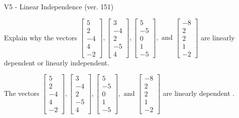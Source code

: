 \begin{exercise}
  \begin{exerciseTitle}V5 - Linear Independence (ver. 151)\end{exerciseTitle}
  \begin{exerciseStatement}
    Explain why the vectors \(\left[\begin{array}{r}
5 \\
2 \\
-4 \\
4 \\
-2
\end{array}\right] , \left[\begin{array}{r}
3 \\
-4 \\
2 \\
-5 \\
4
\end{array}\right] , \left[\begin{array}{r}
5 \\
-5 \\
0 \\
1 \\
-5
\end{array}\right] , \text{ and } \left[\begin{array}{r}
-8 \\
2 \\
2 \\
1 \\
-2
\end{array}\right]\) are linearly dependent or linearly independent.	


  \end{exerciseStatement}
  \begin{exerciseAnswer}
   The vectors \(\left[\begin{array}{r}
5 \\
2 \\
-4 \\
4 \\
-2
\end{array}\right] , \left[\begin{array}{r}
3 \\
-4 \\
2 \\
-5 \\
4
\end{array}\right] , \left[\begin{array}{r}
5 \\
-5 \\
0 \\
1 \\
-5
\end{array}\right] , \text{ and } \left[\begin{array}{r}
-8 \\
2 \\
2 \\
1 \\
-2
\end{array}\right]\) are 
  	 linearly dependent  .
  


  \end{exerciseAnswer}
\end{exercise}